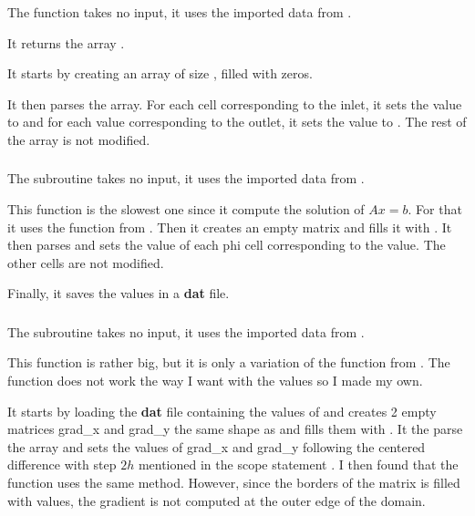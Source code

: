 \subsubsection{\textcolor{func}{}}
The function \textcolor{func}{} takes no input, it uses the
imported data from .

It returns the array .

It starts by creating an array  of size
, filled with zeros.

It then parses the array. For each cell corresponding to the inlet, it sets the
value to  and for each value corresponding to the outlet, it sets
the value to . The rest of the array is not modified.

\subsubsection{\textcolor{func}{}}
The subroutine \textcolor{func}{} takes no input, it uses the
imported data from .

This function is the slowest one since it compute the solution of $Ax = b$. For
that it uses the function  from . Then it creates
an empty matrix  and fills it with . It then parses
 and sets the value of each phi cell corresponding to the  value.
The other cells are not modified.

Finally, it saves the values in a \textbf{dat} file.

\subsubsection{\textcolor{func}{}}
The subroutine \textcolor{func}{} takes no input, it uses the imported data
from .

This function is rather big, but it is only a variation of the 
function from . The function  does not work
the way I want with the  values so I made my own.

It starts by loading the \textbf{dat} file containing the values of 
and creates 2 empty matrices grad\_x and grad\_y the same shape as
 and fills them with . It the parse the 
array and sets the values of grad\_x and grad\_y following the centered
difference with step $2h$ mentioned in the scope statement
\cite{scope-statement}. I then found that the function  uses
the same method. However, since the borders of the matrix  is filled
with  values, the gradient is not computed at the outer edge of
the domain.

